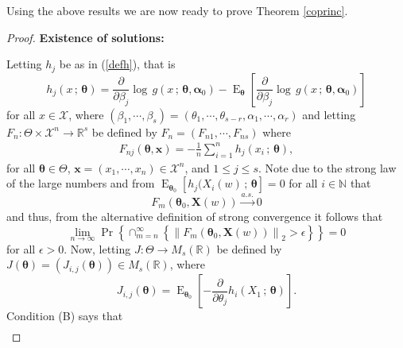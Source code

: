 \documentclass[12pt]{article} %
\newcommand{\f}{\operatorname}
\newcommand{\bs}{\boldsymbol}
\newcommand{\on}{\operatorname}
\theoremstyle{definition}
\begin{document}
\noindent Using the above results we are now ready to prove Theorem \ref{coprinc}.

\begin{proof} 

\noindent \textbf{ Existence of solutions:}
\vspace{0.3cm}

Letting $h_j$ be as in (\ref{defh}), that is
\begin{equation*}
h_j(x\,;\,\bs{\theta}) = \frac{\partial}{\partial \beta_j}\log\, g \left(x\,;\,\bs{\theta},\bs{\alpha}_0\right) - \on{E}_{\bs{\theta}}\left[\frac{\partial}{\partial \beta_j}\log\, g \left(x\,;\,\bs{\theta},\bs{\alpha}_0\right)\right]
\end{equation*}
for all $x\in \mathcal{X}$, where $(\beta_1,\cdots,\beta_s)=(\theta_1,\cdots,\theta_{s-r},\alpha_1,\cdots,\alpha_r)$ and letting $F_n:\Theta\times \mathcal{X}^n\to \mathbb{R}^s$ be defined by $F_n = \left(F_{n1},\cdots,F_{ns}\right)$ where
\begin{equation*}
\begin{aligned}F_{nj}(\bs{\theta},\bs{x})=-\frac{1}{n}\sum_{i=1}^n h_j \left(x_i\,;\,\bs{\theta}\right),
\end{aligned}
\end{equation*}
for all $\bs{\theta}\in \Theta$, $\bs{x}=(x_1,\cdots,x_n)\in \mathcal{X}^n$, and $1\leq j\leq s$. Note due to the strong law of the large numbers and from $\on{E}_{\bs{\theta}_0}\left[h_j(X_i(w)\, ;\, \bs{\theta} \right] = 0$ for all $i\in \mathbb{N}$ that
\begin{equation*} F_m(\bs{\theta}_0,\bs{X}(w))\overset{a.s.}{\to} 0
\end{equation*}
and thus, from the alternative definition of strong convergence it follows that
\begin{equation}\label{weak} \lim_{n\to \infty} \f{Pr}\left\{\cap_{m=n}^\infty\left\{\left\|F_{m}(\bs{\theta}_0,\bs{X}(w))\right\|_2>\epsilon\right\}\right\} = 0
\end{equation}
for all $\epsilon>0$. Now, letting $J:\Theta\to M_s(\mathbb{R})$ be defined by $J(\bs{\theta})=\left(J_{i,j}(\bs{\theta})\right)\in M_s(\mathbb{R})$, where
\begin{equation*}J_{i,j}(\bs{\theta})=
 \on{E}_{\bs{\theta}_0} \left[-\frac{\partial}{\partial\theta_j}h_i(X_1\, ;\, \bs{\theta})\right].
\end{equation*}
Condition (B) says that
\begin{equation}\label{conditionC}
 \begin{aligned}

\end{aligned}
\end{equation}
\end{proof}
\end{document}
